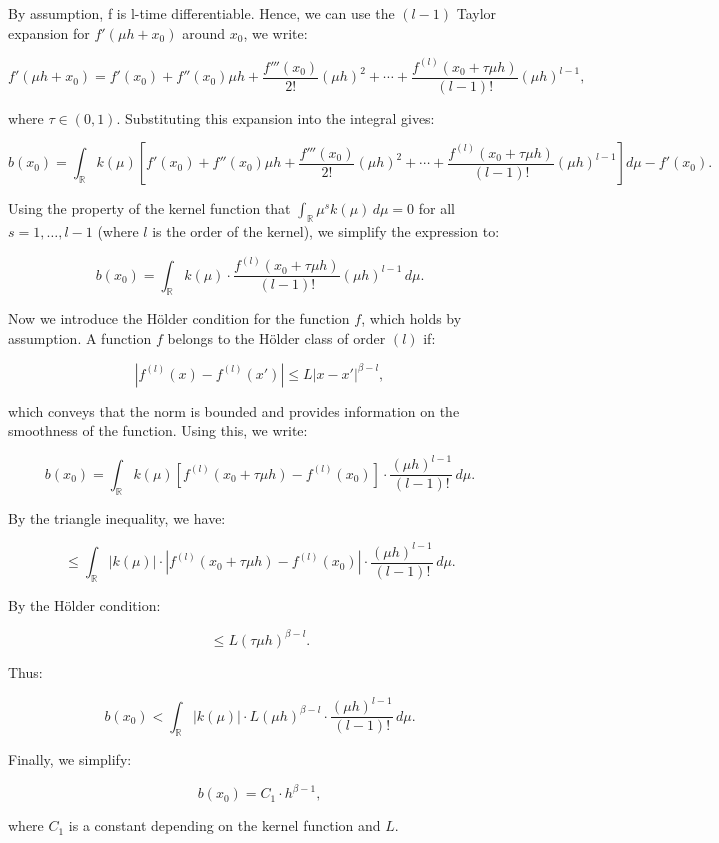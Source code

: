 \documentclass{article}
\begin{document}
By assumption, f is l-time differentiable. Hence, we can use the $(l-1)$ Taylor expansion for \(f'(\mu h + x_0)\) around \(x_0\), we write:

\[
f'(\mu h + x_0) = f'(x_0) + f''(x_0) \mu h + \frac{f'''(x_0)}{2!} (\mu h)^2 + \cdots + \frac{f^{(l)}(x_0 + \tau \mu h)}{(l-1)!} (\mu h)^{l-1},
\]

where \(\tau \in (0, 1)\). Substituting this expansion into the integral gives:

\[
b(x_0) = \int_{\mathbb{R}} k(\mu) \left[f'(x_0) + f''(x_0) \mu h + \frac{f'''(x_0)}{2!} (\mu h)^2 + \cdots + \frac{f^{(l)}(x_0 + \tau \mu h)}{(l-1)!} (\mu h)^{l-1} \right] d\mu - f'(x_0).
\]

Using the property of the kernel function that \(\int_{\mathbb{R}} \mu^s k(\mu) \, d\mu = 0\) for all \(s = 1, \dots, l-1\) (where \(l\) is the order of the kernel), we simplify the expression to:

\[
b(x_0) = \int_{\mathbb{R}} k(\mu) \cdot \frac{f^{(l)}(x_0 + \tau \mu h)}{(l-1)!} (\mu h)^{l-1} \, d\mu.
\]

Now we introduce the Hölder condition for the function \(f\), which holds by assumption. A function \(f\) belongs to the Hölder class of order \((l)\) if:

\[
|f^{(l)}(x) - f^{(l)}(x')| \leq L |x - x'|^{\beta - l},
\]

which conveys that the norm is bounded and provides information on the smoothness of the function. Using this, we write:

\[
b(x_0) = \int_{\mathbb{R}} k(\mu) \left[f^{(l)}(x_0 + \tau \mu h) - f^{(l)}(x_0)\right] \cdot \frac{(\mu h)^{l-1}}{(l-1)!} \, d\mu.
\]

By the triangle inequality, we have:

\[
\leq \int_{\mathbb{R}} |k(\mu)| \cdot \left|f^{(l)}(x_0 + \tau \mu h) - f^{(l)}(x_0)\right| \cdot \frac{(\mu h)^{l-1}}{(l-1)!} \, d\mu.
\]

By the Hölder condition:

\[
\leq L (\tau \mu h)^{\beta - l}.
\]

Thus:

\[
b(x_0) < \int_{\mathbb{R}} |k(\mu)| \cdot L (\mu h)^{\beta - l} \cdot \frac{(\mu h)^{l-1}}{(l-1)!} \, d\mu.
\]

Finally, we simplify:

\[
b(x_0) = C_1 \cdot h^{\beta - 1},
\]

where \(C_1\) is a constant depending on the kernel function and \(L\). \\
\end{document}
